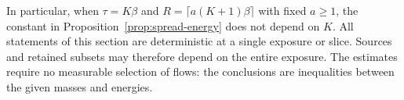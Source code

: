In particular, when \(\tau=K\beta\) and
\(R=\lceil a(K+1)\beta\rceil\) with fixed \(a\ge1\), the constant
in Proposition~\ref{prop:spread-energy} does not depend on \(K\).
All statements of this section are deterministic at a single exposure
or slice.  Sources and retained subsets may therefore depend on the
entire exposure.  The estimates require no measurable selection of
flows: the conclusions are inequalities between the given masses and
energies.
